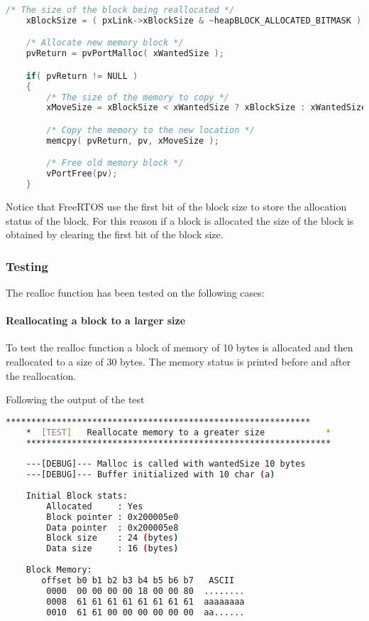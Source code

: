     \begin{codebox}
    \begin{lstlisting}[language=c]
    /* The size of the block being reallocated */
    xBlockSize = ( pxLink->xBlockSize & ~heapBLOCK_ALLOCATED_BITMASK ) - xHeapStructSize;

    /* Allocate new memory block */
    pvReturn = pvPortMalloc( xWantedSize );

    if( pvReturn != NULL )
    {
        /* The size of the memory to copy */
        xMoveSize = xBlockSize < xWantedSize ? xBlockSize : xWantedSize;

        /* Copy the memory to the new location */
        memcpy( pvReturn, pv, xMoveSize );

        /* Free old memory block */
        vPortFree(pv);
    } 
    \end{lstlisting}
    \end{codebox}

    Notice that FreeRTOS use the first bit of the block size to store the allocation status of the block. For this reason if a block is allocated the size of the block is obtained by clearing the first bit of the block size.

    \subsubsection{Testing}
    The realloc function has been tested on the following cases:

    \paragraph{Reallocating a block to a larger size}
    To test the realloc function a block of memory of 10 bytes is allocated and then reallocated to a size of 30 bytes. The memory status is printed before and after the reallocation.

    Following the output of the test

    \begin{outputbox}
    \begin{lstlisting}[language=bash]
    ************************************************************
    *  [TEST]   Reallocate memory to a greater size            *
    ************************************************************
    
    ---[DEBUG]--- Malloc is called with wantedSize 10 bytes
    ---[DEBUG]--- Buffer initialized with 10 char (a)
    
    Initial Block stats:
        Allocated     : Yes
        Block pointer : 0x200005e0
        Data pointer  : 0x200005e8
        Block size    : 24 (bytes)
        Data size     : 16 (bytes)
    
    Block Memory:
       offset b0 b1 b2 b3 b4 b5 b6 b7   ASCII
        0000  00 00 00 00 18 00 00 80  ........
        0008  61 61 61 61 61 61 61 61  aaaaaaaa
        0010  61 61 00 00 00 00 00 00  aa......
    \end{lstlisting}
    \end{outputbox}
    
